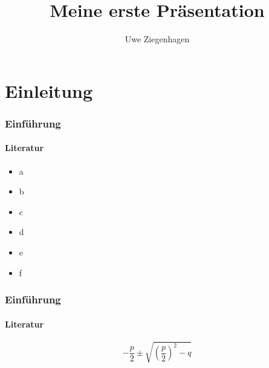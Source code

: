 \documentclass[ngerman]{beamer}
\author{Uwe Ziegenhagen}
\title{Meine erste Präsentation}
\institute{DANTE e.V. Heidelberg}
\begin{document}
\begin{frame}

\maketitle


\end{frame}

\begin{frame}

\tableofcontents

\end{frame}



\section{Einleitung}

\begin{frame}
\frametitle{Einführung}
\framesubtitle{Literatur}

\begin{itemize}
	\item a
	\item b
	\item c
	\item d
	\item e
	\item f
\end{itemize}

\end{frame}

\begin{frame}
\frametitle{Einführung}
\framesubtitle{Literatur}

\begin{equation}
-\frac{p}{2} \pm \sqrt{ \left( \frac{p}{2} \right)^2 - q }
\end{equation}

\end{frame}
\end{document}
